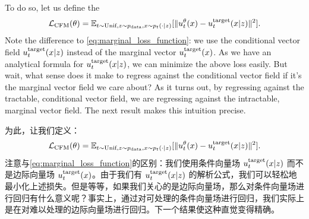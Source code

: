 To do so, let us define the  
\begin{align}
\label{eq:cfm}
\mathcal{L}_{\text{CFM}}(\theta) =     \mathbb{E}_{t\sim \text{Unif}, z\sim p_{\rm{data}}, x\sim p_t(\cdot|z)}[\|u_t^\theta(x) - u^{\text{target}}_t(x|z)\|^2].
\end{align}
Note the difference to     \cref{eq:marginal_loss_function}: we use the conditional vector field $u^{\text{target}}_t(x|z)$ instead of the marginal vector $u^{\text{target}}_t(x)$. As we have an analytical formula for $u^{\text{target}}_t(x|z)$, we can minimize the above loss easily. But wait, what sense does it make to regress against the conditional vector field if it's the marginal vector field we care about? As it turns out, by  regressing against the tractable, conditional vector field, we are  regressing against the intractable, marginal vector field. The next result makes this intuition precise.

为此，让我们定义：
\begin{align}
\label{eq:cfm}
\mathcal{L}_{\text{CFM}}(\theta) =     \mathbb{E}_{t\sim \text{Unif}, z\sim p_{\rm{data}}, x\sim p_t(\cdot|z)}[\|u_t^\theta(x) - u^{\text{target}}_t(x|z)\|^2].
\end{align}
注意与\cref{eq:marginal_loss_function}的区别：我们使用条件向量场 $u^{\text{target}}_t(x|z)$ 而不是边际向量场 $u^{\text{target}}_t(x)$。由于我们有 $u^{\text{target}}_t(x|z)$ 的解析公式，我们可以轻松地最小化上述损失。但是等等，如果我们关心的是边际向量场，那么对条件向量场进行回归有什么意义呢？事实上，通过对可处理的条件向量场进行回归，我们实际上是在对难以处理的边际向量场进行回归。下一个结果使这种直觉变得精确。

